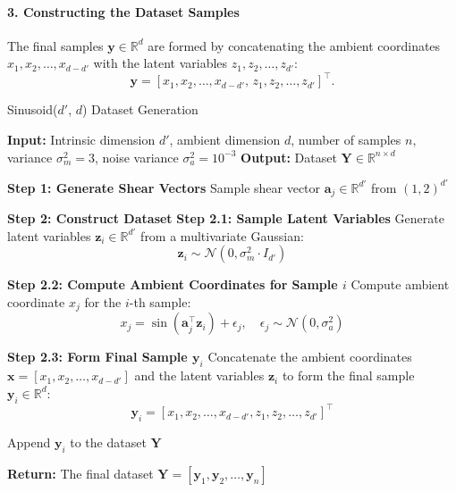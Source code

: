 \paragraph{3. Constructing the Dataset Samples}

The final samples $\mathbf{y} \in \mathbb{R}^d$ are formed by concatenating the ambient coordinates $x_1, x_2, \dots, x_{d-d'}$ with the latent variables $z_1, z_2, \dots, z_{d'}$:
\[
\mathbf{y} = \left[ x_1, x_2, \dots, x_{d-d'}, \, z_1, z_2, \dots, z_{d'} \right]^\top.
\]

\begin{algorithm}[H]
    \caption{Sinusoid($d'$, $d$) Dataset Generation}
    \begin{algorithmic}[1]
        \STATE \textbf{Input:} Intrinsic dimension $d'$, ambient dimension $d$, number of samples $n$, variance $\sigma_m^2 = 3$, noise variance $\sigma_a^2 = 10^{-3}$
        \STATE \textbf{Output:} Dataset $\mathbf{Y} \in \mathbb{R}^{n \times d}$

        \STATE \textbf{Step 1: Generate Shear Vectors}
            \STATE Sample shear vector $\mathbf{a}_j \in \mathbb{R}^{d'}$ from $(1, 2)^{d'}$
        \ENDFOR

        \STATE \textbf{Step 2: Construct Dataset}
            \STATE \textbf{Step 2.1: Sample Latent Variables}
            \STATE Generate latent variables $\mathbf{z}_i \in \mathbb{R}^{d'}$ from a multivariate Gaussian:
            \[
            \mathbf{z}_i \sim \mathcal{N}(0, \sigma_m^2 \cdot I_{d'})
            \]

            \STATE \textbf{Step 2.2: Compute Ambient Coordinates for Sample $i$}
                \STATE Compute ambient coordinate $x_j$ for the $i$-th sample:
                \[
                x_j = \sin\left( \mathbf{a}_j^\top \mathbf{z}_i \right) + \epsilon_j, \quad \epsilon_j \sim \mathcal{N}(0, \sigma_a^2)
                \]
            \ENDFOR

            \STATE \textbf{Step 2.3: Form Final Sample $\mathbf{y}_i$}
            \STATE Concatenate the ambient coordinates $\mathbf{x} = [x_1, x_2, \dots, x_{d-d'}]$ and the latent variables $\mathbf{z}_i$ to form the final sample $\mathbf{y}_i \in \mathbb{R}^d$:
            \[
            \mathbf{y}_i = [x_1, x_2, \dots, x_{d-d'}, z_1, z_2, \dots, z_{d'}]^\top
            \]

            \STATE Append $\mathbf{y}_i$ to the dataset $\mathbf{Y}$
        \ENDFOR
        
        \STATE \textbf{Return:} The final dataset $\mathbf{Y} = [\mathbf{y}_1, \mathbf{y}_2, \dots, \mathbf{y}_n]$
    \end{algorithmic}
\end{algorithm}


